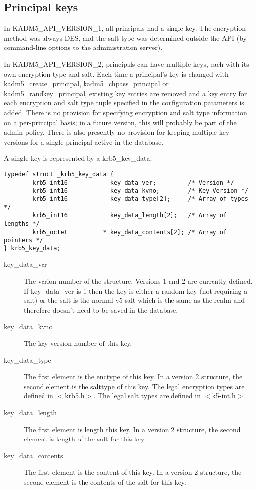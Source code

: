 \subsection{Principal keys}
\label{sec:keys}

In KADM5_API_VERSION_1, all principals had a single key.  The
encryption method was always DES, and the salt type was determined
outside the API (by command-line options to the administration
server).

In KADM5_API_VERSION_2, principals can have multiple keys, each with
its own encryption type and salt.  Each time a principal's key is
changed with kadm5_create_principal, kadm5_chpass_principal or
kadm5_randkey_principal, existing key entries are removed and a key
entry for each encryption and salt type tuple specified in the
configuration parameters is added.  There is no provision for
specifying encryption and salt type information on a per-principal
basis; in a future version, this will probably be part of the admin
policy.  There is also presently no provision for keeping multiple key
versions for a single principal active in the database.

A single key is represented by a krb5_key_data:
%
\begin{verbatim}
typedef struct _krb5_key_data {
        krb5_int16            key_data_ver;         /* Version */
        krb5_int16            key_data_kvno;        /* Key Version */
        krb5_int16            key_data_type[2];     /* Array of types */
        krb5_int16            key_data_length[2];   /* Array of lengths */
        krb5_octet          * key_data_contents[2]; /* Array of pointers */
} krb5_key_data;
\end{verbatim}
%
\begin{description}
\item[key_data_ver] The verion number of the structure.  Versions 1
and 2 are currently defined.  If key_data_ver is 1 then the key is
either a random key (not requiring a salt) or the salt is the normal
v5 salt which is the same as the realm and therefore doesn't need to
be saved in the database.

\item[key_data_kvno] The key version number of this key.

\item[key_data_type] The first element is the enctype of this key.  In
a version 2 structure, the second element is the salttype of this key.
The legal encryption types are defined in $<$krb5.h$>$.  The legal
salt types are defined in $<$k5-int.h$>$.

\item[key_data_length] The first element is length this key.  In a
version 2 structure, the second element is length of the salt for this
key.

\item[key_data_contents] The first element is the content of this key.
In a version 2 structure, the second element is the contents of the
salt for this key.
\end{description}

